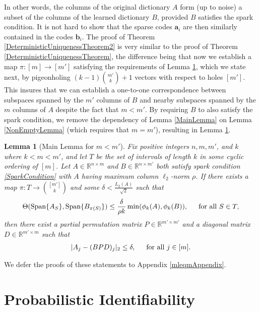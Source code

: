 \documentclass[journal, onecolumn]{IEEEtran}
\newtheorem{lemma}{Lemma}
\begin{document}
In other words, the columns of the original dictionary $A$ form (up to noise) a subset of the columns of the learned dictionary $B$, provided $B$ satisfies the spark condition. It is not hard to show that the sparse codes $\mathbf{a}_i$ are then similarly contained in the codes $\mathbf{b}_i$. The proof of Theorem \ref{DeterministicUniquenessTheorem2} is very similar to the proof of Theorem \ref{DeterministicUniquenessTheorem}, the difference being that now we establish a map $\pi: [m] \to [m']$ satisfying the requirements of Lemma \ref{MainLemma2}, which we state next, by pigeonholing $(k-1){m' \choose k} + 1$ vectors with respect to holes $[m']$. This insures that we can establish a one-to-one correspondence between subspaces spanned by the $m'$ columns of $B$ and nearby subspaces spanned by the $m$ columns of $A$ despite the fact that $m < m'$. By requiring $B$ to also satisfy the spark condition, we remove the dependency of Lemma \ref{MainLemma} on Lemma \ref{NonEmptyLemma} (which requires that $m = m'$), resulting in Lemma \ref{MainLemma2}.

\begin{lemma}[Main Lemma for $m < m'$]\label{MainLemma2}
Fix positive integers $n, m, m'$, and $k$ where $k < m < m'$, and let $T$ be the set of intervals of length $k$ in some cyclic ordering of $[m]$. Let $A \in \mathbb{R}^{n \times m}$ and $B \in \mathbb{R}^{n \times m'}$ both satisfy spark condition \eqref{SparkCondition} with $A$ having maximum column $\ell_2$-norm $\rho$. If there exists a map $\pi: T \to {[m'] \choose k}$ and some $\delta < \frac{L_{2}(A)}{\sqrt{2}}$ such that 
\begin{equation}\label{GapUpperBound2}
\Theta(\text{\rm Span}\{A_{S}\}, \text{\rm Span}\{B_{\pi(S)}\}) \leq \frac{ \delta }{\rho k} \min(\phi_k(A), \phi_k(B)), \indent \text{for all } S \in T,
\end{equation}
%
then there exist a partial permutation matrix $P \in \mathbb{R}^{m' \times m'}$ and a diagonal matrix $D \in \mathbb{R}^{m' \times m}$ such that
\begin{align}
|A_j - (BPD)_j|_2 \leq \delta, \indent \text{for all } j \in [m].
\end{align}
\end{lemma}

We defer the proofs of these statements to Appendix \ref{mleqmAppendix}.


\section{Probabilistic Identifiability}\label{PUT}
\end{document}
